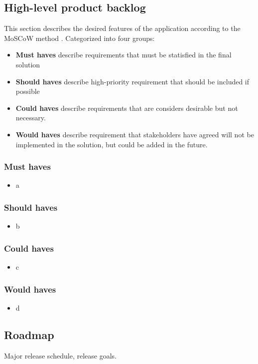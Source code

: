 \subsection{High-level product backlog}
This section describes the desired features of the application according to the MoSCoW method \cite{brennan2009guide}. Categorized into four groups:
\begin{itemize}
\item \textbf{Must haves} describe requirements that must be statisfied in the final solution
\item \textbf{Should haves} describe high-priority requirement that should be included if possible
\item \textbf{Could haves} describe requirements that are considers desirable but not necessary.
\item \textbf{Would haves} describe requirement that stakeholders have agreed will not be implemented in the solution, but could be added in the future.
\end{itemize}

\subsubsection{Must haves}
\begin{itemize}
\item a
\end{itemize}

\subsubsection{Should haves}
\begin{itemize}
\item b
\end{itemize}

\subsubsection{Could haves}
\begin{itemize}
\item c
\end{itemize}

\subsubsection{Would haves}
\begin{itemize}
\item d
\end{itemize}

\subsection{Roadmap}
Major release schedule, release goals.